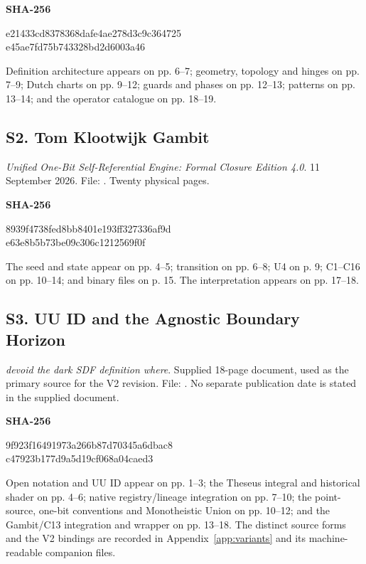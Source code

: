 \documentclass[11pt,a4paper]{article}
\numberwithin{equation}{section}
\begin{document}
\textbf{SHA-256}
\begin{center}\small\ttfamily
e21433cd8378368dafe4ae278d3c9c364725\\
e45ae7fd75b743328bd2d6003a46
\end{center}
Definition architecture appears on pp. 6--7; geometry, topology and hinges on pp. 7--9; Dutch charts on pp. 9--12; guards and phases on pp. 12--13; patterns on pp. 13--14; and the operator catalogue on pp. 18--19.

\subsection*{S2. Tom Klootwijk Gambit}
\emph{Unified One-Bit Self-Referential Engine: Formal Closure Edition 4.0}. 11 September 2026. File: . Twenty physical pages.

\textbf{SHA-256}
\begin{center}\small\ttfamily
8939f4738fed8bb8401e193ff327336af9d\\
e63e8b5b73be09c306c1212569f0f
\end{center}
The seed and state appear on pp. 4--5; transition on pp. 6--8; U4 on p. 9; C1--C16 on pp. 10--14; and binary files on p. 15. The interpretation appears on pp. 17--18.

\subsection*{S3. UU ID and the Agnostic Boundary Horizon}
\emph{devoid the dark SDF definition where}. Supplied 18-page document, used as the primary source for the V2 revision. File: . No separate publication date is stated in the supplied document.

\textbf{SHA-256}
\begin{center}\small\ttfamily
9f923f16491973a266b87d70345a6dbac8\\
c47923b177d9a5d19cf068a04caed3
\end{center}
Open notation and UU ID appear on pp. 1--3; the Theseus integral and historical shader on pp. 4--6; native registry/lineage integration on pp. 7--10; the point-source, one-bit conventions and Monotheistic Union on pp. 10--12; and the Gambit/C13 integration and wrapper on pp. 13--18. The distinct source forms and the V2 bindings are recorded in Appendix~\ref{app:variants} and its machine-readable companion files.
\end{document}
